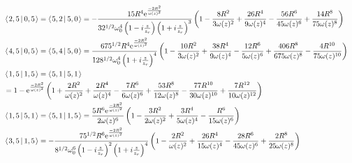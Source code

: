 \documentclass[11pt]{amsart}
\makeatletter
\newcommand{\e}{{\rm e}}				%
\newcommand{\msp}[1]{\mspace{#1mu}}		%
\newcommand{\0}{\varnothing}		%
\newcommand{\brac}[2]{\left\langle\msp{2} #1\left\lvert \msp{3.5} #2 \right.\right\rangle}	%
\newcommand{\1}{!}
\newcommand{\2}{@}
\newcommand{\3}{\#}
\newcommand{\4}{\$}
\newcommand{\5}{\%}
\newcommand{\6}{$^\wedge$}
\newcommand{\7}{\&}
\newcommand{\8}{*}
\newcommand{\9}{(}
\makeatother
\begin{document}
\begin{align*}
\\
&
\brac{2,5}{0,5} = \brac{5,2}{5,0} = -\frac{15R^4\e^{\frac{-2R^2}{\omega(z)^2}}}{32^{1/2}\omega_0^4\left(1-i\frac{z}{z_r}\right)\left(1+i\frac{z}{z_r}\right)^3}\left(1-\frac{8R^2}{3\omega(z)^2}+\frac{26R^4}{9\omega(z)^4}-\frac{56R^6}{45\omega(z)^6}+\frac{14R^8}{75\omega(z)^8}\right)
\\
&
\brac{4,5}{0,5} = \brac{5,4}{5,0} = \frac{675^{1/2}R^4\e^{\frac{-2R^2}{\omega(z)^2}}}{128^{1/2}\omega_0^4\left(1+i\frac{z}{z_r}\right)^4}\left(1-\frac{10R^2}{3\omega(z)^2}+\frac{38R^4}{9\omega(z)^4}-\frac{12R^6}{5\omega(z)^6}+\frac{406R^8}{675\omega(z)^8}-\frac{4R^{10}}{75\omega(z)^{10}}\right)
\\
&
\brac{1,5}{1,5} = \brac{5,1}{5,1} 
\\
&= 1-\e^{\frac{-2R^2}{\omega(z)^2}}\left(1+\frac{2R^2}{\omega(z)^2}+\frac{2R^4}{\omega(z)^4}-\frac{7R^6}{6\omega(z)^6}+\frac{53R^8}{12\omega(z)^8}-\frac{77R^{10}}{30\omega(z)^{10}}+\frac{7R^{12}}{10\omega(z)^{12}}\right)
\\
&
\brac{1,5}{5,1} = \brac{5,1}{1,5} =\frac{5R^6\e^{\frac{-2R^2}{\omega(z)^2}}}{2\omega(z)^6}\left(1-\frac{3R^2}{2\omega(z)^2}+\frac{3R^4}{5\omega(z)^4}-\frac{R^6}{15\omega(z)^6}\right)
\\
&
\brac{3,5}{1,5} = -\frac{75^{1/2}R^6\e^{\frac{-2R^2}{\omega(z)^2}}}{8^{1/2}\omega_0^6\left(1-i\frac{z}{z_r}\right)^2\left(1+i\frac{z}{z_r}\right)^4}\left(1-\frac{2R^2}{\omega(z)^2}+\frac{26R^4}{15\omega(z)^4}-\frac{28R^6}{45\omega(z)^6}+\frac{2R^8}{25\omega(z)^8}\right)
\end{align*}
\end{document}
